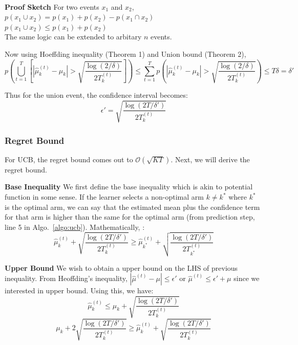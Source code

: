 \documentclass[11pt]{article}
\begin{document}
\\
\normalfont\textbf{Proof Sketch} For two events $x_1$ and $x_2$, $p(x_1 \cup x_2) = p(x_1) + p(x_2) - p(x_1 \cap x_2)$\\
$p(x_1 \cup x_2) \le p(x_1) + p(x_2)$\\
The same logic can be extended to arbitary $n$ events.

Now using Hoeffding inequality (Theorem 1) and Union bound (Theorem 2), 
$$p(\bigcup_{t=1}^T\left[|\hat{\mu}_k^{(t)} - \mu_k| > \sqrt{\frac{\log(2/\delta)}{2T_{k}^{(t)}}} \right]) \le \sum_{t=1}^Tp\left(|\hat{\mu}_k^{(t)} - \mu_k| > \sqrt{\frac{\log(2/\delta)}{2T_{k}^{(t)}}}\right) \le T\delta = \delta'$$

Thus for the union event, the confidence interval becomes:
$$\epsilon' = \sqrt{\frac{\log(2T/\delta')}{2T_{k}^{(t)}}}$$

\subsubsection{Regret Bound}

For UCB, the regret bound comes out to $\mathcal{O}(\sqrt{KT})$. Next, we will derive the regret bound.


\textbf{Base Inequality} We first define the base inequality which is akin to potential function in some sense. If the learner selects a non-optimal arm $k \neq k^*$ where $k^*$ is the optimal arm, we can say that the estimated mean plus the confidence term for that arm is higher than the same for the optimal arm (from prediction step, line 5 in Algo.~\ref{algo:ucb}). Mathematically, :
$$\hat{\mu}_k^{(t)} + \sqrt{\frac{\log(2T/\delta')}{2T_{k}^{(t)}}} \ge \hat{\mu}_{k^*}^{(t)} + \sqrt{\frac{\log(2T/\delta')}{2T_{k^*}^{(t)}}}$$

\textbf{Upper Bound} We wish to obtain a upper bound on the LHS of previous inequality. From Heoffding's inequality, $|\hat{\mu}^{(t)} - \mu| \le \epsilon'$ or $\hat{\mu}^{(t)} \le \epsilon' + \mu$ since we interested in upper bound. Using this, we have: 
$$\hat{\mu}_k^{(t)} \le \mu_k + \sqrt{\frac{\log(2T/\delta')}{2T_{k}^{(t)}}}$$
$$\mu_k + 2\sqrt{\frac{\log(2T/\delta')}{2T_{k}^{(t)}}} \ge \hat{\mu}_k^{(t)} + \sqrt{\frac{\log(2T/\delta')}{2T_{k}^{(t)}}}$$
\end{document}
